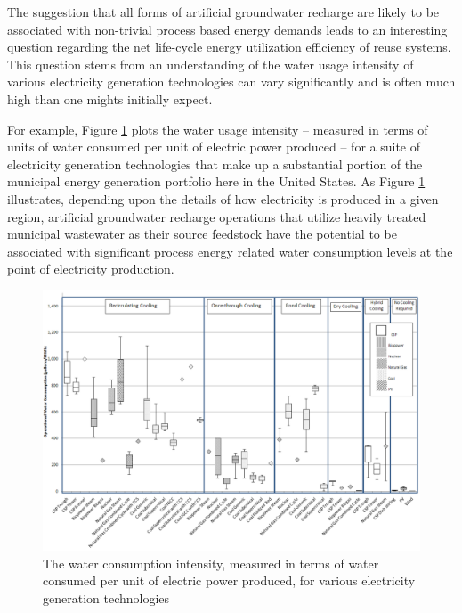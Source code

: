  The suggestion that all forms of artificial groundwater recharge are likely to be associated with non-trivial process based energy demands leads to an interesting question regarding the net life-cycle energy utilization efficiency of reuse systems. This question stems from an understanding of the water usage intensity of various electricity generation technologies can vary significantly and is often much high than one mights initially expect. 
 
For example, Figure \ref{fig:water-consumption-intensity} plots the water usage intensity -- measured in terms of units of water consumed per unit of electric power produced -- for a suite of electricity generation technologies that make up a substantial portion of the municipal energy generation portfolio here in the United States. As Figure \ref{fig:water-consumption-intensity} illustrates, depending upon the details of how electricity is produced in a given region, artificial groundwater recharge operations that utilize heavily treated municipal wastewater as their source feedstock have the potential to be associated with significant process energy related water consumption levels at the point of electricity production.
 
       \begin{figure}[!h]
           \centering
           \includegraphics[width=5.5in]{figures/water_consumption_for_energy.png}
           \caption[Water Intensity of Energy Production]{The water consumption intensity, measured in terms of water consumed per unit of electric power produced, for various electricity generation technologies \cite{Averyt2013}}
           \label{fig:water-consumption-intensity}
       \end{figure}
        
